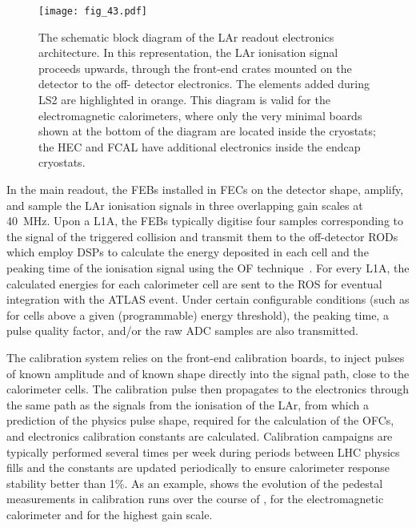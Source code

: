 \documentclass[cernpreprint, atlasdraft=false, UKenglish,british,orcidlogo, texmf, orcidlogo]{atlasdoc}
\begin{document}
 
\begin{figure}[htbp]
\begin{center}
\texttt{[image: fig\_43.pdf]}
\end{center}
\caption{The schematic block diagram of the \RunThr \gls{LAr} readout electronics architecture. In this
representation, the
\gls{LAr} ionisation signal proceeds upwards, through the front-end crates mounted on the detector to the off-
detector electronics. The elements added during \gls{LS2} are highlighted in orange.
This diagram is valid for the electromagnetic calorimeters, where only the very minimal boards shown at the bottom of the diagram are located inside the cryostats; the \gls{HEC} and \gls{FCAL} have additional electronics inside the endcap cryostats.
}
\label{fig:lar-run3-arch}
\end{figure}
 
In the main readout, the \glspl{FEB} installed in \glspl{FEC} on the detector
shape, amplify, and sample the \gls{LAr} ionisation
signals in three overlapping gain scales at \SI{40}{MHz}. Upon a \gls{L1A},
the \glspl{FEB} typically digitise four samples corresponding to the signal
of the triggered collision
and transmit them to the off-detector \glspl{ROD} which employ \glspl{DSP} to calculate the energy deposited in each cell and the
peaking time of the ionisation signal using the \gls{OF} technique~\cite{cleland}.
For every \gls{L1A}, the calculated energies for each calorimeter cell are
sent to the \gls{ROS} for eventual integration with the ATLAS event.
Under certain configurable conditions (such as for cells above a given (programmable) energy threshold), the peaking time, a pulse quality factor, and/or the raw \gls{ADC} samples are also transmitted.
 
The calibration
system relies on the front-end calibration boards, to inject pulses of
known amplitude and of known shape directly
into the signal path, close to the calorimeter cells. The calibration pulse
then propagates to the electronics through the same path as the
signals from the ionisation of the \gls{LAr}, from which a prediction of the physics pulse shape,
required for the calculation of the \glspl{OFC},
and electronics calibration constants are calculated. Calibration campaigns are
typically performed several times per week during periods between \gls{LHC} physics fills and the
constants are updated periodically to ensure calorimeter response
stability better than 1\%.
As an example, \Fig{\ref{fig:LArCalibStability}} shows the
evolution of the pedestal measurements in calibration runs  over the course of \RunTwo,
for the electromagnetic calorimeter and for the highest gain scale.
 
\end{document}
